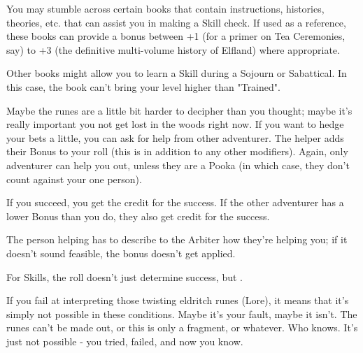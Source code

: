 {   

   You may stumble across certain books that contain instructions, histories, theories, etc. that can assist you in making a Skill check.  If used as a reference, these books can provide a bonus between +1 (for a primer on Tea Ceremonies, say) to +3 (the definitive multi-volume history of Elfland) where appropriate. 

   Other books might allow you to learn a Skill during a Sojourn or Sabattical.  In this case, the book can't bring your level higher than "Trained".



  Maybe the runes are a little bit harder to decipher than you thought; maybe it's really important you not get lost in the woods right now.  If you want to hedge your bets a little, you can ask for help from  other adventurer.  The helper adds their Bonus to your roll (this is in addition to any other modifiers).  Again, only  adventurer can help you out, unless they are a Pooka (in which case, they don't count against your one person).

  If you succeed, you get the credit for the success.  If the other adventurer has a lower Bonus than you do, they also get credit for the success.


  The person helping has to describe to the Arbiter how they're helping you; if it doesn't sound feasible, the bonus doesn't get applied.



  For Skills, the \RO roll doesn't just determine success, but .  

  If you fail at interpreting those twisting eldritch runes (Lore), it means that it's simply not possible in these conditions.  Maybe it's your fault, maybe it isn't.  The runes can't be made out, or this is only a fragment, or whatever.  Who knows.  It's just not possible - you tried, failed, and now you know.

}
